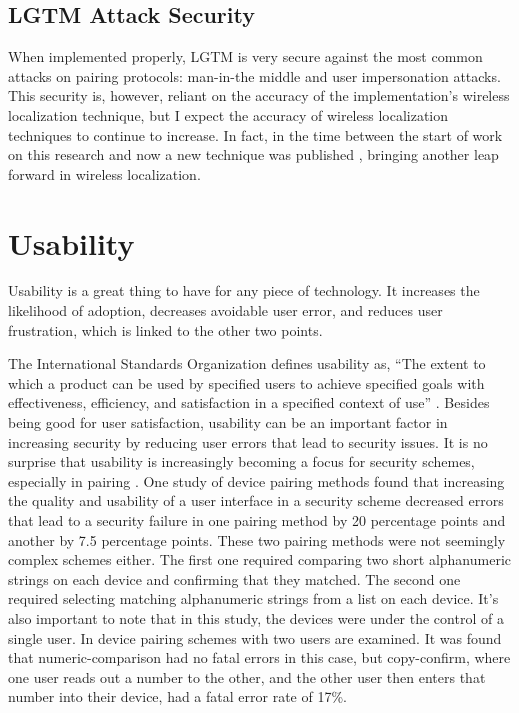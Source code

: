 \documentclass[12pt]{report}
\begin{document}
\subsection{LGTM Attack Security}
When implemented properly, LGTM is very secure against the most common attacks on pairing protocols: man-in-the middle and user impersonation attacks. This security is, however, reliant on the accuracy of the implementation's wireless localization technique, but I expect the accuracy of wireless localization techniques to continue to increase. In fact, in the time between the start of work on this research and now a new technique was published \cite{ChronosSingleAPLocalizationVasisht2016}, bringing another leap forward in wireless localization. \par


\section{Usability}
Usability is a great thing to have for any piece of technology. It increases the likelihood of adoption, decreases avoidable user error, and reduces user frustration, which is linked to the other two points. \par

The International Standards Organization defines usability as, ``The extent to which a product can be used by specified users to achieve specified goals with effectiveness, efficiency, and satisfaction in a specified context of use'' \cite{UsabilityISO1998}. Besides being good for user satisfaction, usability can be an important factor in increasing security by reducing user errors that lead to security issues. It is no surprise that usability is increasingly becoming a focus for security schemes, especially in pairing \cite{UsabilitySecurityOutOfBandPairingKainda2009,UserPerceptionPairing,PlayfulPairingGallego2011,AliceMeetsBobKumar2009,SecurePairingUsabilityUzun2007,ConferenceCompStudySecurePairingKumar2009}. One study of device pairing methods \cite{SecurePairingUsabilityUzun2007} found that increasing the quality and usability of a user interface in a security scheme decreased errors that lead to a security failure in one pairing method by 20 percentage points and another by 7.5 percentage points. These two pairing methods were not seemingly complex schemes either. The first one required comparing two short alphanumeric strings on each device and confirming that they matched. The second one required selecting matching alphanumeric strings from a list on each device. It's also important to note that in this study, the devices were under the control of a single user. In \cite{AliceMeetsBobKumar2009} device pairing schemes with two users are examined. It was found that numeric-comparison had no fatal errors in this case, but copy-confirm, where one user reads out a number to the other, and the other user then enters that number into their device, had a fatal error rate of 17\%. \par
\end{document}
